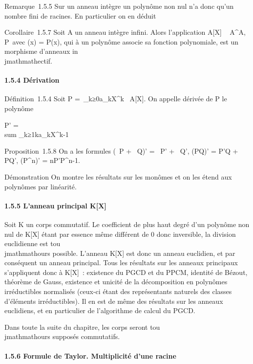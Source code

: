 Remarque~1.5.5 Sur un anneau intègre un polynôme non nul n'a donc qu'un
nombre fini de racines. En particulier on en déduit

Corollaire~1.5.7 Soit A un anneau intègre infini. Alors l'application
A{[}X{]} \rightarrow~ A^A,
P\mapsto~\tildeP avec
\tildeP(x) = P(x), qui à un polynôme associe sa
fonction polynomiale, est un morphisme d'anneaux in\\jmathmathectif.

\paragraph{1.5.4 Dérivation}

Définition~1.5.4 Soit P =\
\sum  _k≥0a_kX^k~ \in
A{[}X{]}. On appelle dérivée de P le polynôme

P' = \\sum
_k≥1ka_kX^k-1

Proposition~1.5.8 On a les formules (\alpha~P + \beta~Q)' = \alpha~P' + \beta~Q', (PQ)' = P'Q
+ PQ', (P^n)' = nP'P^n-1.

Démonstration On montre les résultats sur les monômes et on les étend
aux polynômes par linéarité.

\paragraph{1.5.5 L'anneau principal K{[}X{]}}

Soit K un corps commutatif. Le coefficient de plus haut degré d'un
polynôme non nul de K{[}X{]} étant par essence même différent de 0 donc
inversible, la division euclidienne est tou\\jmathmathours possible. L'anneau
K{[}X{]} est donc un anneau euclidien, et par conséquent un anneau
principal. Tous les résultats sur les anneaux principaux s'appliquent
donc à K{[}X{]}~: existence du PGCD et du PPCM, identité de Bézout,
théorème de Gauss, existence et unicité de la décomposition en polynômes
irréductibles normalisés (ceux-ci étant des représentants naturels des
classes d'éléments irréductibles). Il en est de même des résultats sur
les anneaux euclidiens, et en particulier de l'algorithme de calcul du
PGCD.

Dans toute la suite du chapitre, les corps seront tou\\jmathmathours supposés
commutatifs.

\paragraph{1.5.6 Formule de Taylor. Multiplicité d'une racine}

